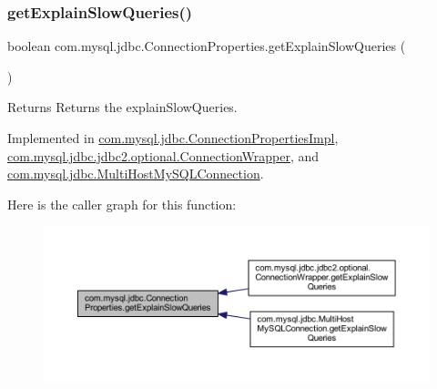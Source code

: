 \subsubsection{\texorpdfstring{get\+Explain\+Slow\+Queries()}{getExplainSlowQueries()}}
{\footnotesize\ttfamily boolean com.\+mysql.\+jdbc.\+Connection\+Properties.\+get\+Explain\+Slow\+Queries (\begin{DoxyParamCaption}{ }\end{DoxyParamCaption})}

\begin{DoxyReturn}{Returns}
Returns the explain\+Slow\+Queries. 
\end{DoxyReturn}


Implemented in \mbox{\hyperlink{classcom_1_1mysql_1_1jdbc_1_1_connection_properties_impl_aa03592149273154c28f81b184c3af796}{com.\+mysql.\+jdbc.\+Connection\+Properties\+Impl}}, \mbox{\hyperlink{classcom_1_1mysql_1_1jdbc_1_1jdbc2_1_1optional_1_1_connection_wrapper_adc6ad75acb4cedeadb60e9676687734e}{com.\+mysql.\+jdbc.\+jdbc2.\+optional.\+Connection\+Wrapper}}, and \mbox{\hyperlink{classcom_1_1mysql_1_1jdbc_1_1_multi_host_my_s_q_l_connection_a338dacd49865ecaa1edaad1fa98e85a6}{com.\+mysql.\+jdbc.\+Multi\+Host\+My\+S\+Q\+L\+Connection}}.

Here is the caller graph for this function\+:\nopagebreak
\begin{figure}[H]
\begin{center}
\leavevmode
\includegraphics[width=350pt]{interfacecom_1_1mysql_1_1jdbc_1_1_connection_properties_a51ec93b6fe482627e109814e0985c940_icgraph}
\end{center}
\end{figure}
\mbox{\label{interfacecom_1_1mysql_1_1jdbc_1_1_connection_properties_a14f395dcf2b5c008aef09513895925f7}} 
